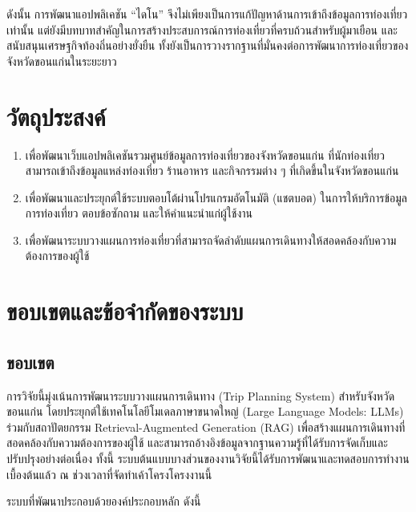 ดังนั้น การพัฒนาแอปพลิเคชัน ``ไดโน'' จึงไม่เพียงเป็นการแก้ปัญหาด้านการเข้าถึงข้อมูลการท่องเที่ยวเท่านั้น แต่ยังมีบทบาทสำคัญในการสร้างประสบการณ์การท่องเที่ยวที่ครบถ้วนสำหรับผู้มาเยือน และสนับสนุนเศรษฐกิจท้องถิ่นอย่างยั่งยืน ทั้งยังเป็นการวางรากฐานที่มั่นคงต่อการพัฒนาการท่องเที่ยวของจังหวัดขอนแก่นในระยะยาว

\section{วัตถุประสงค์}

\begin{enumerate}[label=\arabic*)]
    \item เพื่อพัฒนาเว็บแอปพลิเคชันรวมศูนย์ข้อมูลการท่องเที่ยวของจังหวัดขอนแก่น ที่นักท่องเที่ยวสามารถเข้าถึงข้อมูลแหล่งท่องเที่ยว ร้านอาหาร และกิจกรรมต่าง ๆ ที่เกิดขึ้นในจังหวัดขอนแก่น
    \item เพื่อพัฒนาและประยุกต์ใช้ระบบตอบโต้ผ่านโปรแกรมอัตโนมัติ (แชตบอต) ในการให้บริการข้อมูลการท่องเที่ยว ตอบข้อซักถาม และให้คำแนะนำแก่ผู้ใช้งาน
    \item เพื่อพัฒนาระบบวางแผนการท่องเที่ยวที่สามารถจัดลำดับแผนการเดินทางให้สอดคล้องกับความต้องการของผู้ใช้
\end{enumerate}

\section{ขอบเขตและข้อจำกัดของระบบ}

\subsection{ขอบเขต}

การวิจัยนี้มุ่งเน้นการพัฒนาระบบวางแผนการเดินทาง (Trip Planning System) สำหรับจังหวัดขอนแก่น โดยประยุกต์ใช้เทคโนโลยีโมเดลภาษาขนาดใหญ่ (Large Language Models: LLMs) ร่วมกับสถาปัตยกรรม Retrieval-Augmented Generation (RAG) เพื่อสร้างแผนการเดินทางที่สอดคล้องกับความต้องการของผู้ใช้ และสามารถอ้างอิงข้อมูลจากฐานความรู้ที่ได้รับการจัดเก็บและปรับปรุงอย่างต่อเนื่อง ทั้งนี้ ระบบต้นแบบบางส่วนของงานวิจัยนี้ได้รับการพัฒนาและทดสอบการทำงานเบื้องต้นแล้ว ณ ช่วงเวลาที่จัดทำเค้าโครงโครงงานนี้

ระบบที่พัฒนาประกอบด้วยองค์ประกอบหลัก ดังนี้

